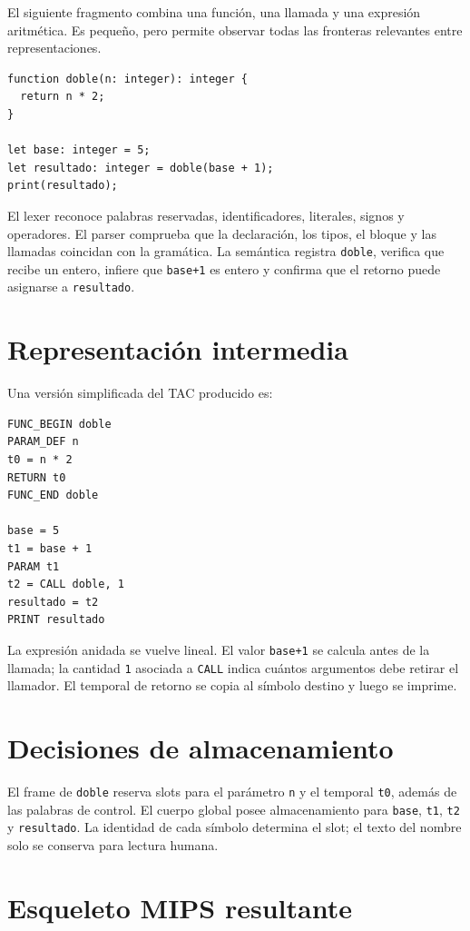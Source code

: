 \documentclass[11pt,letterpaper,oneside]{report}
\newcommand{\codigo}[1]{\texttt{#1}}
\begin{document}
El siguiente fragmento combina una funci\'on, una llamada y una expresi\'on aritm\'etica. Es peque\~no, pero permite observar todas las fronteras relevantes entre representaciones.

\begin{verbatim}
function doble(n: integer): integer {
  return n * 2;
}

let base: integer = 5;
let resultado: integer = doble(base + 1);
print(resultado);
\end{verbatim}

El lexer reconoce palabras reservadas, identificadores, literales, signos y operadores. El parser comprueba que la declaraci\'on, los tipos, el bloque y las llamadas coincidan con la gram\'atica. La sem\'antica registra \codigo{doble}, verifica que recibe un entero, infiere que \codigo{base+1} es entero y confirma que el retorno puede asignarse a \codigo{resultado}.

\section{Representaci\'on intermedia}

Una versi\'on simplificada del TAC producido es:

\begin{verbatim}
FUNC_BEGIN doble
PARAM_DEF n
t0 = n * 2
RETURN t0
FUNC_END doble

base = 5
t1 = base + 1
PARAM t1
t2 = CALL doble, 1
resultado = t2
PRINT resultado
\end{verbatim}

La expresi\'on anidada se vuelve lineal. El valor \codigo{base+1} se calcula antes de la llamada; la cantidad \codigo{1} asociada a \codigo{CALL} indica cu\'antos argumentos debe retirar el llamador. El temporal de retorno se copia al s\'imbolo destino y luego se imprime.

\section{Decisiones de almacenamiento}

El frame de \codigo{doble} reserva slots para el par\'ametro \codigo{n} y el temporal \codigo{t0}, adem\'as de las palabras de control. El cuerpo global posee almacenamiento para \codigo{base}, \codigo{t1}, \codigo{t2} y \codigo{resultado}. La identidad de cada s\'imbolo determina el slot; el texto del nombre solo se conserva para lectura humana.

\section{Esqueleto MIPS resultante}
\end{document}
